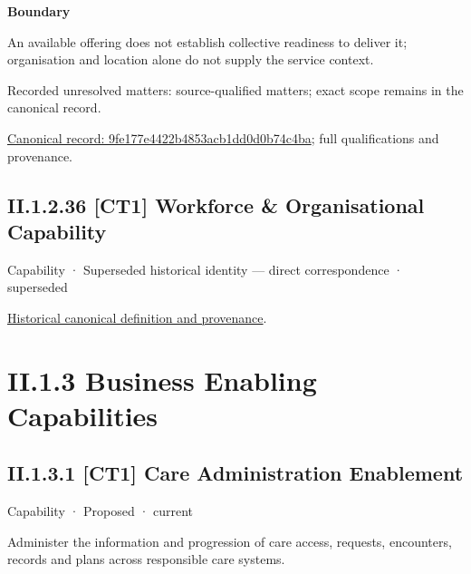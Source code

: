 \textbf{Boundary}



An available offering does not establish collective readiness to deliver it; organisation and location alone do not supply the service context.


{\small Recorded unresolved matters: source-qualified matters; exact scope remains in the canonical record.}\par
{\footnotesize \href{../../../../continuum/strategy/capability/9fe177e4422b4853acb1dd0d0b74c4ba.md}{Canonical record: 9fe177e4422b4853acb1dd0d0b74c4ba}; full qualifications and provenance.}\par
\subsection*{II.1.2.36 [CT1] Workforce \& Organisational Capability}
\label{navigation:II.1.2.36}

\label{element:b1161fe1a315420fbc7d048a1ea58126}
{\small Capability · Superseded historical identity — direct correspondence · superseded}\par
\href{../../../../continuum/strategy/capability/b1161fe1a315420fbc7d048a1ea58126.md}{Historical canonical definition and provenance}.\par
\section*{II.1.3 Business Enabling Capabilities}
\label{navigation:II.1.3}

\subsection*{II.1.3.1 [CT1] Care Administration Enablement}
\label{navigation:II.1.3.1}

\label{element:28df27d55c514a37995145ab46945f78}
{\small Capability · Proposed · current}\par

Administer the information and progression of care access, requests, encounters, records and plans across responsible care systems.



